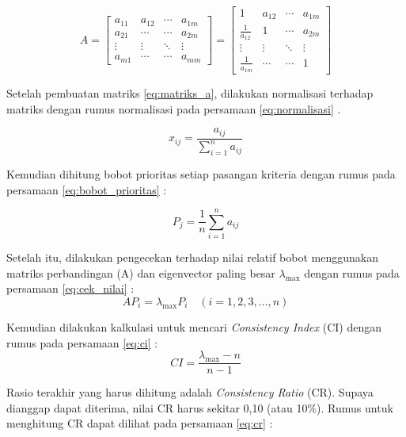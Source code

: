 \documentclass[journal,article,submit,pdftex,moreauthors]{Definitions/mdpi}
\begin{document}
\begin{equation}
A = \begin{bmatrix}
a_{11} & a_{12} & \cdots & a_{1m} \\
a_{21} & \cdots & \cdots & a_{2m} \\
\vdots & \vdots & \ddots & \vdots \\
a_{m1} & \cdots & \cdots & a_{mm}
\end{bmatrix} = 
\begin{bmatrix}
1 & a_{12} & \cdots & a_{1m} \\
\frac{1}{a_{12}} & 1 & \cdots & a_{2m} \\
\vdots & \vdots & \ddots & \vdots \\
\frac{1}{a_{1m}} & \cdots & \cdots & 1
\end{bmatrix}
\label{eq:matriks_a}
\end{equation}

Setelah pembuatan matriks \ref{eq:matriks_a}, dilakukan normalisasi terhadap matriks dengan rumus normalisasi pada persamaan \ref{eq:normalisasi} \cite{Singh2019}.

\begin{equation}
x_{ij} = \frac{a_{ij}}{\sum_{i=1}^{n} a_{ij}}
\label{eq:normalisasi}
\end{equation}

Kemudian dihitung bobot prioritas setiap pasangan kriteria dengan rumus pada persamaan \ref{eq:bobot_prioritas} \cite{Singh2019}:

\begin{equation}
P_j = \frac{1}{n} \sum_{i=1}^{n} a_{ij}
\label{eq:bobot_prioritas}
\end{equation}

Setelah itu, dilakukan pengecekan terhadap nilai relatif bobot menggunakan matriks perbandingan (A) dan eigenvector paling besar $\lambda_{\text{max}}$ dengan rumus pada persamaan \ref{eq:cek_nilai} \cite{Singh2019}:
\begin{equation}
AP_i = \lambda_{\text{max}} P_i \quad (i = 1, 2, 3, \ldots, n)
\label{eq:cek_nilai}
\end{equation}

Kemudian dilakukan kalkulasi untuk mencari \textit{Consistency Index} (CI) dengan rumus pada persamaan \ref{eq:ci} \cite{Singh2019}:
\begin{equation}
CI = \frac{\lambda_{\text{max}} - n}{n - 1}
\label{eq:ci}
\end{equation}

Rasio terakhir yang harus dihitung adalah \textit{Consistency Ratio} (CR). Supaya dianggap dapat diterima, nilai CR harus sekitar 0,10 (atau 10\%). Rumus untuk menghitung CR dapat dilihat pada persamaan \ref{eq:cr} \cite{Singh2019}:
\end{document}
